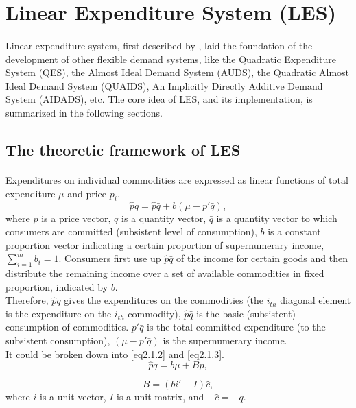 \section{Linear Expenditure System (LES)}
\cite{Stone1954}
\paragraph{}{Linear expenditure system, first described by \cite{Stone1954}, laid the foundation of the development of other flexible demand systems, like the Quadratic Expenditure System (QES), the Almost Ideal Demand System (AUDS), the Quadratic Almost Ideal Demand System (QUAIDS), An Implicitly Directly Additive Demand System (AIDADS), etc. The core idea of LES, and its implementation, is summarized in the following sections. }

\subsection{The theoretic framework of  LES}
\paragraph{}{Expenditures on individual commodities are expressed as linear functions of total expenditure $\mu$ and price $p_i$.
	\begin{equation}\label{eq2.1.1}
		\hat{p}q = \hat{p} \bar{q} + b(\mu - p' \bar{q}),
	\end{equation}
where $p$ is a price vector, $q$ is a quantity vector, $\bar{q}$ is a quantity vector to which consumers are committed (subsistent level of consumption), $b$ is a constant proportion vector indicating a certain proportion of supernumerary income, $\sum_{i=1}^{m}b_i=1$. Consumers first use up $\hat{p}\bar{q}$ of the income for certain goods and then distribute the remaining income over a  set of available commodities in fixed proportion, indicated by $b$. \\

Therefore, $\hat{p}q$ gives the expenditures on the commodities (the $i_{th}$ diagonal element is the expenditure on the $i_{th}$ commodity), $\hat{p}\bar{q}$ is the basic (subsistent) consumption of commodities. $p'\bar{q}$ is the total committed expenditure (to the subsistent consumption), $(\mu - p' \bar{q})$ is the supernumerary income.\\

It could be broken down into \cref{eq2.1.2} and \cref{eq2.1.3}.
	\begin{equation} \label{eq2.1.2}
		\hat{p}q = b \mu + Bp,
	\end{equation}

	\begin{equation} \label{eq2.1.3}
		B = (bi'-I)\hat{c},
	\end{equation}
where $i$ is a unit vector, $I$ is a unit matrix, and $-\hat{c} = -q$. 
}



